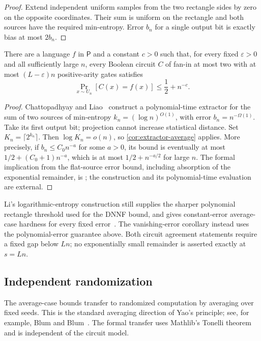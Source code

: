 \documentclass[11pt]{article}
\theoremstyle{plain}
\theoremstyle{definition}
\theoremstyle{remark}
\begin{document}
\begin{proof}
Extend independent uniform samples from the two rectangle sides by zero on the opposite
coordinates. Their sum is uniform on the rectangle and both sources have the required
min-entropy. Error $b_n$ for a single output bit is exactly bias at most $2b_n$.
\end{proof}

\begin{corollary}
\label{cor:explicit-average}
There are a language $f$ in $\mathsf P$ and a constant $c>0$ such that, for every fixed
$\varepsilon>0$ and all sufficiently large $n$, every Boolean circuit $C$ of fan-in at
most two with at most $(L-\varepsilon)n$ positive-arity gates satisfies
\[
  \Pr_{x\sim U_n}[C(x)=f(x)]\le\frac12+n^{-c}.
\]
\end{corollary}

\begin{proof}
Chattopadhyay and Liao~\cite[Theorem~1]{ChattopadhyayLiao2022} construct a polynomial-time
extractor for the sum of two sources of min-entropy $k_n=(\log n)^{O(1)}$, with error
$b_n=n^{-\Omega(1)}$. Take its first output bit; projection cannot increase statistical
distance. Set $K_n=\lceil2^{k_n}\rceil$. Then $\log K_n=o(n)$, so
\cref{cor:extractor-average} applies. More precisely, if $b_n\le C_0n^{-a}$ for some
$a>0$, its bound is eventually at most $1/2+(C_0+1)n^{-a}$, which is at most
$1/2+n^{-a/2}$ for large $n$. The formal implication from the flat-source error bound,
including absorption of the exponential remainder, is
; the construction and its polynomial-time
evaluation are external.
\end{proof}

Li's logarithmic-entropy construction still supplies the sharper polynomial rectangle
threshold used for the DNNF bound, and gives constant-error average-case hardness
for every fixed error~\cite{Li2023}. The vanishing-error corollary instead uses the
polynomial-error guarantee above. Both circuit agreement statements require a fixed gap
below $Ln$; no exponentially small remainder is asserted exactly at $s=Ln$.

\subsection{Independent randomization}
\label{sec:randomized}

The average-case bounds transfer to randomized computation by averaging over fixed
seeds. This is the standard averaging direction of Yao's principle; see, for example,
Blum and Blum~\cite[Section~5.4]{BlumBlum2006}. The formal transfer uses Mathlib's
Tonelli theorem and is independent of the circuit model.
\end{document}
